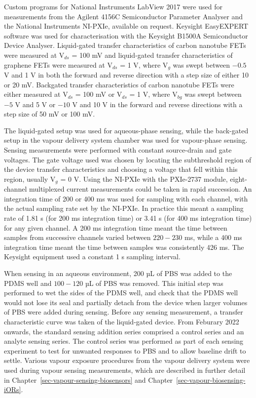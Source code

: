 \documentclass[
  a4paper,
]{scrbook}
\begin{document}
Custom programs for National Instruments LabView 2017 were used for
measurements from the Agilent 4156C Semiconductor Parameter Analyser and
the National Instruments NI-PXIe, available on request. Keysight
EasyEXPERT software was used for characterisation with the Keysight
B1500A Semiconductor Device Analyser. Liquid-gated transfer
characteristics of carbon nanotube FETs were measured at V\(_{ds}\) =
100 mV and liquid-gated transfer characteristics of graphene FETs were
measured at V\(_{ds}\) = 1 V, where V\(_{g}\) was swept between \(-0.5\)
V and 1 V in both the forward and reverse direction with a step size of
either 10 or 20 mV. Backgated transfer characteristics of carbon
nanotube FETs were either measured at V\(_{ds}\) = 100 mV or V\(_{ds}\)
= 1 V, where V\(_{bg}\) was swept between \(-5\) V and 5 V or \(-10\) V
and 10 V in the forward and reverse directions with a step size of 50 mV
or 100 mV.

The liquid-gated setup was used for aqueous-phase sensing, while the
back-gated setup in the vapour delivery system chamber was used for
vapour-phase sensing. Sensing measurements were performed with constant
source-drain and gate voltages. The gate voltage used was chosen by
locating the subthreshold region of the device transfer characteristics
and choosing a voltage that fell within this region, usually V\(_{g}\) =
0 V. Using the NI-PXIe with the PXIe-2737 module, eight-channel
multiplexed current measurements could be taken in rapid succession. An
integration time of 200 or 400 ms was used for sampling with each
channel, with the actual sampling rate set by the NI-PXIe. In practice
this meant a sampling rate of 1.81 s (for 200 ms integration time) or
3.41 s (for 400 ms integration time) for any given channel. A 200 ms
integration time meant the time between samples from successive channels
varied between \(220 - 230\) ms, while a 400 ms integration time meant
the time between samples was consistently 426 ms. The Keysight equipment
used a constant 1 s sampling interval.

When sensing in an aqueous environment, 200 µL of PBS was added to the
PDMS well and \(100 - 120\) µL of PBS was removed. This initial step was
performed to wet the sides of the PDMS well, and check that the PDMS
well would not lose its seal and partially detach from the device when
larger volumes of PBS were added during sensing. Before any sensing
measurement, a transfer characteristic curve was taken of the
liquid-gated device. From Feburary 2022 onwards, the standard sensing
addition series comprised a control series and an analyte sensing
series. The control series was performed as part of each sensing
experiment to test for unwanted responses to PBS and to allow baseline
drift to settle. Various vapour exposure procedures from the vapour
delivery system were used during vapour sensing measurements, which are
described in further detail in
Chapter~\ref{sec-vapour-sensing-biosensors} and
Chapter~\ref{sec-vapour-biosensing-iORs}.
\end{document}
